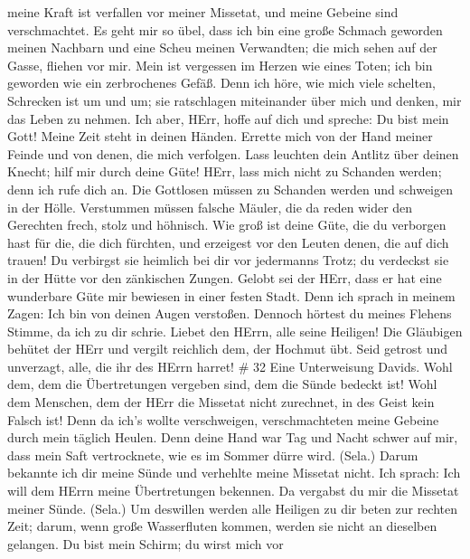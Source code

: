meine Kraft ist verfallen vor meiner Missetat, und meine Gebeine sind
verschmachtet.  Es geht mir so übel, dass ich bin eine
große Schmach geworden meinen Nachbarn und eine Scheu meinen Verwandten;
die mich sehen auf der Gasse, fliehen vor mir.  Mein ist
vergessen im Herzen wie eines Toten; ich bin geworden wie ein
zerbrochenes Gefäß.  Denn ich höre, wie mich viele
schelten, Schrecken ist um und um; sie ratschlagen miteinander über mich
und denken, mir das Leben zu nehmen.  Ich aber, HErr, hoffe
auf dich und spreche: Du bist mein Gott!  Meine Zeit steht
in deinen Händen. Errette mich von der Hand meiner Feinde und von denen,
die mich verfolgen.  Lass leuchten dein Antlitz über deinen
Knecht; hilf mir durch deine Güte!  HErr, lass mich nicht
zu Schanden werden; denn ich rufe dich an. Die Gottlosen müssen zu
Schanden werden und schweigen in der Hölle.  Verstummen
müssen falsche Mäuler, die da reden wider den Gerechten frech, stolz und
höhnisch.  Wie groß ist deine Güte, die du verborgen hast
für die, die dich fürchten, und erzeigest vor den Leuten denen, die auf
dich trauen!  Du verbirgst sie heimlich bei dir vor
jedermanns Trotz; du verdeckst sie in der Hütte vor den zänkischen
Zungen.  Gelobt sei der HErr, dass er hat eine wunderbare
Güte mir bewiesen in einer festen Stadt.  Denn ich sprach
in meinem Zagen: Ich bin von deinen Augen verstoßen. Dennoch hörtest du
meines Flehens Stimme, da ich zu dir schrie.  Liebet den
HErrn, alle seine Heiligen! Die Gläubigen behütet der HErr und vergilt
reichlich dem, der Hochmut übt.  Seid getrost und
unverzagt, alle, die ihr des HErrn harret! \# 32  Eine
Unterweisung Davids. Wohl dem, dem die Übertretungen vergeben sind, dem
die Sünde bedeckt ist!  Wohl dem Menschen, dem der HErr die
Missetat nicht zurechnet, in des Geist kein Falsch ist! 
Denn da ich's wollte verschweigen, verschmachteten meine Gebeine durch
mein täglich Heulen.  Denn deine Hand war Tag und Nacht
schwer auf mir, dass mein Saft vertrocknete, wie es im Sommer dürre
wird. (Sela.)  Darum bekannte ich dir meine Sünde und
verhehlte meine Missetat nicht. Ich sprach: Ich will dem HErrn meine
Übertretungen bekennen. Da vergabst du mir die Missetat meiner Sünde.
(Sela.)  Um deswillen werden alle Heiligen zu dir beten zur
rechten Zeit; darum, wenn große Wasserfluten kommen, werden sie nicht an
dieselben gelangen.  Du bist mein Schirm; du wirst mich vor
